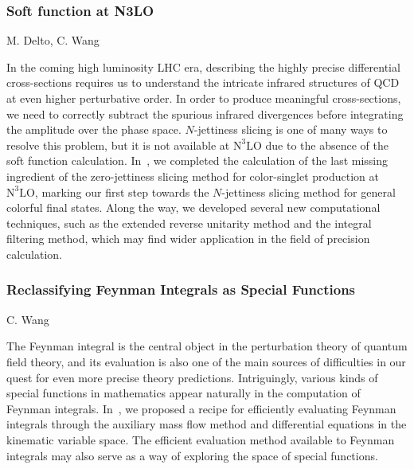 \documentclass{FBR_Bericht_2025}
\begin{document}
\begin{refsection}
\subsubsection{Soft function at N3LO}
\begin{Namen}
M. Delto, C. Wang
\end{Namen}
%
In the coming high luminosity LHC era, describing the highly precise differential cross-sections requires us to understand the intricate infrared structures of QCD at even higher perturbative order.
In order to produce meaningful cross-sections, we need to correctly subtract the spurious infrared divergences before integrating the amplitude over the phase space.
$N$-jettiness slicing is one of many ways to resolve this problem, but it is not available at $\text{N}^{3}\text{LO}$ due to the absence of the soft function calculation.
In~\cite{Baranowski:2024ene,Baranowski:2024vxg,Baranowski:2024ysi}, we completed the calculation of the last missing ingredient of the zero-jettiness slicing method for color-singlet production at $\text{N}^{3}\text{LO}$, marking our first step towards the $N$-jettiness slicing method for general colorful final states.
Along the way, we developed several new computational techniques, such as the extended reverse unitarity method and the integral filtering method, which may find wider application in the field of precision calculation.
%
\subsubsection{Reclassifying Feynman Integrals as Special Functions}
\begin{Namen}
C. Wang
\end{Namen}
%
The Feynman integral is the central object in the perturbation theory of quantum field theory, and its evaluation is also one of the main sources of difficulties in our quest for even more precise theory predictions.
Intriguingly, various kinds of special functions in mathematics appear naturally in the computation of Feynman integrals.
In~\cite{Liu:2023jkr}, we proposed a recipe for efficiently evaluating Feynman integrals through the auxiliary mass flow method and differential equations in the kinematic variable space.
The efficient evaluation method available to Feynman integrals may also serve as a way of exploring the space of special functions.
%
%

\end{refsection}
\end{document}
